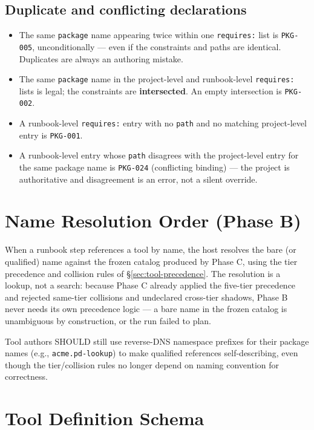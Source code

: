 \subsection{Duplicate and conflicting declarations}

\begin{itemize}
  \item The same \texttt{package} name appearing twice within one
        \texttt{requires:} list is \texttt{PKG-005}, unconditionally --- even
        if the constraints and paths are identical. Duplicates are always an
        authoring mistake.
  \item The same \texttt{package} name in the project-level and
        runbook-level \texttt{requires:} lists is legal; the constraints are
        \textbf{intersected}. An empty intersection is \texttt{PKG-002}.
  \item A runbook-level \texttt{requires:} entry with no \texttt{path} and no
        matching project-level entry is \texttt{PKG-001}.
  \item A runbook-level entry whose \texttt{path} disagrees with the
        project-level entry for the same package name is \texttt{PKG-024}
        (conflicting binding) --- the project is authoritative and
        disagreement is an error, not a silent override.
\end{itemize}

\section{Name Resolution Order (Phase B)}
\label{sec:tool-name-resolution}

When a runbook step references a tool by name, the host resolves the bare (or
qualified) name against the frozen catalog produced by Phase C, using the
tier precedence and collision rules of \S\ref{sec:tool-precedence}. The
resolution is a lookup, not a search: because Phase C already applied the
five-tier precedence and rejected same-tier collisions and undeclared
cross-tier shadows, Phase B never needs its own precedence logic --- a bare
name in the frozen catalog is unambiguous by construction, or the run failed
to plan.

Tool authors SHOULD still use reverse-DNS namespace prefixes for their
package names (e.g., \texttt{acme.pd-lookup}) to make qualified references
self-describing, even though the tier/collision rules no longer depend on
naming convention for correctness.

\section{Tool Definition Schema}
\label{sec:tool-definition-schema}


